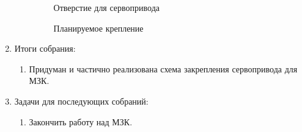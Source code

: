 \begin{enumerate}
\begin{enumerate}
\begin{figure}[H]
\begin{minipage}[h]{0.31\linewidth}
      		\caption{Отверстие для сервопривода}
      	\end{minipage}
      	\hfill
      	\begin{minipage}[h]{0.31\linewidth}
      		\caption{Планируемое крепление}
      	\end{minipage}
      \end{figure}
      
    \end{enumerate}
    
	\item Итоги собрания: 
	\begin{enumerate}
	  \item Придуман и частично реализована схема закрепления сервопривода для МЗК.
	  
    \end{enumerate}
    
	\item Задачи для последующих собраний:
	\begin{enumerate}
	  \item Закончить работу над МЗК.
	  
    \end{enumerate}     
\end{enumerate}
\fillpage
